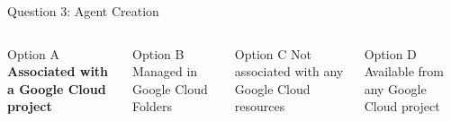 \documentclass[aspectratio=169]{beamer}
\begin{document}
\begin{frame}{Question 3: Agent Creation}
    \begin{center}
    \end{center}
    
    \vspace{1em}
    
    \begin{columns}
        \begin{block}{Option A}
            \textcolor{googlegreen}{\faCheckCircle} \textbf{Associated with a Google Cloud project}
        \end{block}
        
        \begin{block}{Option B}
            \textcolor{googlered}{\faTimesCircle} Managed in Google Cloud Folders
        \end{block}
        
        \begin{block}{Option C}
            \textcolor{googlered}{\faTimesCircle} Not associated with any Google Cloud resources
        \end{block}
        
        \begin{block}{Option D}
            \textcolor{googlered}{\faTimesCircle} Available from any Google Cloud project
        \end{block}
    \end{columns}
\end{frame}
\end{document}

